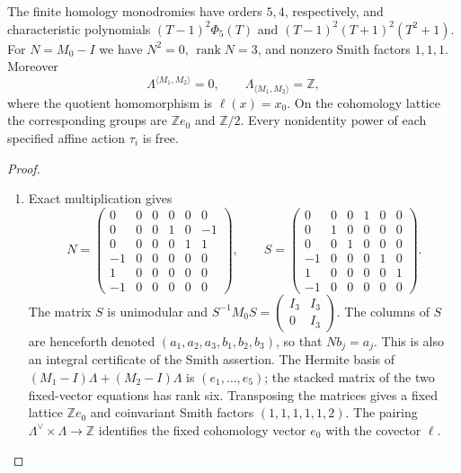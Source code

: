 \begin{theorem}\label{night:P1.1}
The finite homology monodromies have orders $5,4$, respectively, and
characteristic polynomials
$(T-1)^2\Phi _5(T)$ and $(T-1)^2(T+1)^2(T^2+1)$.
For $N=M_0-I$ we have $N^2=0$, $\operatorname{rank}N=3$, and
nonzero Smith factors $1,1,1$.  Moreover
\[
 \Lambda^{\langle M_1,M_2\rangle}=0,\qquad
 \Lambda_{\langle M_1,M_2\rangle}=\mathbb Z,
\]
where the quotient homomorphism is $\ell(x)=x_0$.
On the cohomology lattice the corresponding groups are $\mathbb Ze_0$
and $\mathbb Z/2$.  Every nonidentity power of each specified affine
action $\tau_i$ is free.
\end{theorem}
\begin{proof}
\begin{enumerate}[label=\arabic*.]
\item Exact multiplication gives
\[
N=\begin{pmatrix}
0&0&0&0&0&0\\0&0&0&1&0&-1\\0&0&0&0&1&1\\
-1&0&0&0&0&0\\1&0&0&0&0&0\\-1&0&0&0&0&0
\end{pmatrix},\qquad
S=\begin{pmatrix}
0&0&0&1&0&0\\0&1&0&0&0&0\\0&0&1&0&0&0\\
-1&0&0&0&1&0\\1&0&0&0&0&1\\-1&0&0&0&0&0
\end{pmatrix}.
\]
The matrix $S$ is unimodular and
$S^{-1}M_0S=\left(\begin{smallmatrix}I_3&I_3\\0&I_3\end{smallmatrix}\right)$.
The columns of $S$ are henceforth denoted
$(a_1,a_2,a_3,b_1,b_2,b_3)$, so that $Nb_j=a_j$.
This is also an integral certificate of the Smith assertion.
The Hermite basis of
$(M_1-I)\Lambda+(M_2-I)\Lambda$ is $(e_1,\ldots,e_5)$;
the stacked matrix of the two fixed-vector equations has rank six.
Transposing the matrices gives a fixed lattice $\mathbb Ze_0$ and
coinvariant Smith factors $(1,1,1,1,1,2)$.  The pairing
$\Lambda^\vee\times\Lambda\longrightarrow\mathbb Z$ identifies the
fixed cohomology vector $e_0$ with the covector $\ell$.


\end{enumerate}
\end{proof}
